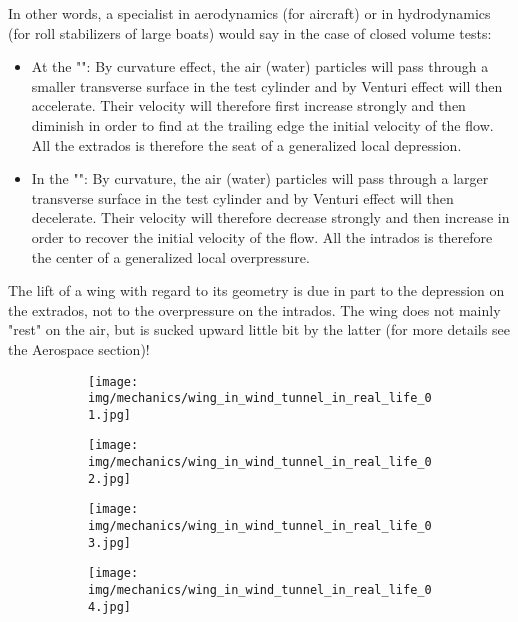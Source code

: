 	In other words, a specialist in aerodynamics (for aircraft) or in hydrodynamics (for roll stabilizers of large boats) would say in the case of closed volume tests:
	\begin{itemize}
		\item At the "": By curvature effect, the air (water) particles will pass through a smaller transverse surface in the test cylinder and by Venturi effect will then accelerate. Their velocity will therefore first increase strongly and then diminish in order to find at the trailing edge the initial velocity of the flow. All the extrados is therefore the seat of a generalized local depression.

		\item In the "": By curvature, the air (water) particles will pass through a larger transverse surface in the test cylinder and by Venturi effect will then decelerate. Their velocity will therefore decrease strongly and then increase in order to recover the initial velocity of the flow. All the intrados is therefore the center of a generalized local overpressure.
	\end{itemize}
	The lift of a wing with regard to its geometry is due in part to the depression on the extrados, not to the overpressure on the intrados. The wing does not mainly "rest" on the air, but is sucked upward little bit by the latter (for more details see the Aerospace section)!
	\begin{figure}[H]
		\centering
		\begin{subfigure}{.45\textwidth}
		  \centering
		  \texttt{[image: img/mechanics/wing\_in\_wind\_tunnel\_in\_real\_life\_01.jpg]}
		\end{subfigure}
		\begin{subfigure}{.45\textwidth}
		  \centering
		  \texttt{[image: img/mechanics/wing\_in\_wind\_tunnel\_in\_real\_life\_02.jpg]}
		\end{subfigure}
	\end{figure}
	\begin{figure}[H]
		\centering
		\begin{subfigure}{.45\textwidth}
		  \centering
		  \texttt{[image: img/mechanics/wing\_in\_wind\_tunnel\_in\_real\_life\_03.jpg]}
		\end{subfigure}
		\begin{subfigure}{.45\textwidth}
		  \centering
		  \texttt{[image: img/mechanics/wing\_in\_wind\_tunnel\_in\_real\_life\_04.jpg]}
		\end{subfigure}
	\end{figure}

